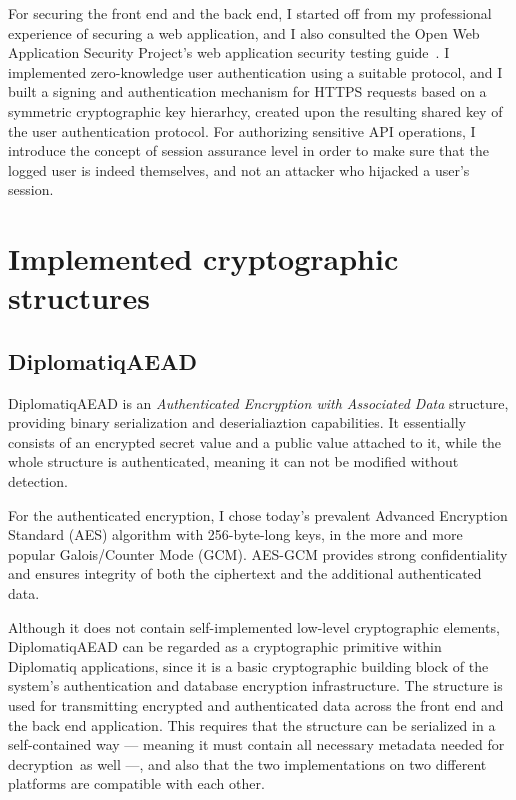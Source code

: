 For securing the front end and the back end, I started off from my professional experience of securing a web application, and I also consulted the Open Web Application Security Project's web application security testing guide~\cite{owasp-webtestguide}. I implemented zero-knowledge user authentication using a suitable protocol, and I built a signing and authentication mechanism for HTTPS requests based on a symmetric cryptographic key hierarhcy, created upon the resulting shared key of the user authentication protocol. For authorizing sensitive API operations, I introduce the concept of session assurance level in order to make sure that the logged user is indeed themselves, and not an attacker who hijacked a user's session.

\section{Implemented cryptographic structures}

\subsection{DiplomatiqAEAD}

DiplomatiqAEAD is an \emph{Authenticated Encryption with Associated Data} structure, providing binary serialization and deserialiaztion capabilities. It essentially consists of an encrypted secret value and a public value attached to it, while the whole structure is authenticated, meaning it can not be modified without detection.

For the authenticated encryption, I chose today's prevalent Advanced Encryption Standard (AES) algorithm with 256-byte-long keys, in the more and more popular Galois/Counter Mode (GCM). AES-GCM provides strong confidentiality and ensures integrity of both the ciphertext and the additional authenticated data.

Although it does not contain self-implemented low-level cryptographic elements, DiplomatiqAEAD can be regarded as a cryptographic primitive within Diplomatiq applications, since it is a basic cryptographic building block of the system's authentication and database encryption infrastructure. The structure is used for transmitting encrypted and authenticated data across the front end and the back end application. This requires that the structure can be serialized in a self-contained way — meaning it must contain all necessary metadata needed for decryption as well —, and also that the two implementations on two different platforms are compatible with each other.

